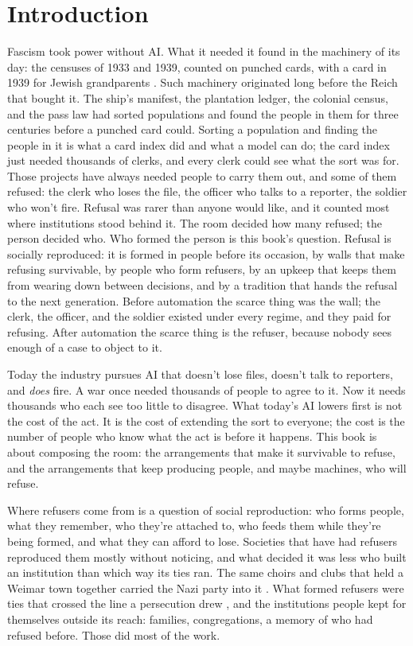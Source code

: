 \chapter*{Introduction}
Fascism took power without AI. What it needed it found in the machinery of its day: the censuses of 1933 and 1939, counted on punched cards, with a card in 1939 for Jewish grandparents \autocite{aly2004census}. Such machinery originated long before the Reich that bought it. The ship's manifest, the plantation ledger, the colonial census, and the pass law had sorted populations and found the people in them for three centuries before a punched card could. Sorting a population and finding the people in it is what a card index did and what a model can do; the card index just needed thousands of clerks, and every clerk could see what the sort was for. Those projects have always needed people to carry them out, and some of them refused: the clerk who loses the file, the officer who talks to a reporter, the soldier who won't fire. Refusal was rarer than anyone would like, and it counted most where institutions stood behind it. The room decided how many refused; the person decided who. Who formed the person is this book's question. Refusal is socially reproduced: it is formed in people before its occasion, by walls that make refusing survivable, by people who form refusers, by an upkeep that keeps them from wearing down between decisions, and by a tradition that hands the refusal to the next generation. Before automation the scarce thing was the wall; the clerk, the officer, and the soldier existed under every regime, and they paid for refusing. After automation the scarce thing is the refuser, because nobody sees enough of a case to object to it.

Today the industry pursues AI that doesn't lose files, doesn't talk to reporters, and \emph{does} fire. A war once needed thousands of people to agree to it. Now it needs thousands who each see too little to disagree. What today's AI lowers first is not the cost of the act. It is the cost of extending the sort to everyone; the cost is the number of people who know what the act is before it happens. This book is about composing the room: the arrangements that make it survivable to refuse, and the arrangements that keep producing people, and maybe machines, who will refuse.

Where refusers come from is a question of social reproduction: who forms people, what they remember, who they're attached to, who feeds them while they're being formed, and what they can afford to lose. Societies that have had refusers reproduced them mostly without noticing, and what decided it was less who built an institution than which way its ties ran. The same choirs and clubs that held a Weimar town together carried the Nazi party into it \autocite{satyanath2017bowling}. What formed refusers were ties that crossed the line a persecution drew \autocite{oliner1988altruistic,varshney2002ethnic}, and the institutions people kept for themselves outside its reach: families, congregations, a memory of who had refused before. Those did most of the work.

